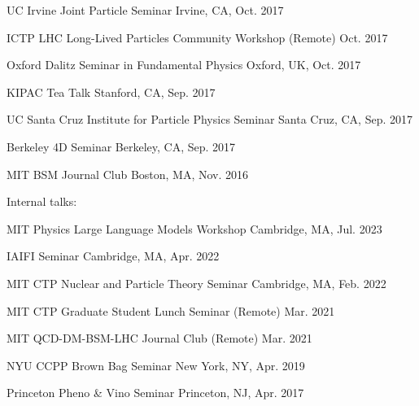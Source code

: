 \documentclass[letterpaper,11pt]{article}
\newenvironment{packed_itemize}{
\begin{itemize}[label=\raisebox{0.25ex}{\tiny$\bullet$}]
  \setlength{\itemsep}{4.0pt}
  \setlength{\parskip}{0pt}
  \setlength{\parsep}{0pt}}{\end{itemize}
}
\begin{document}
\begin{packed_itemize}
  \item UC Irvine Joint Particle Seminar \hfill Irvine, CA, Oct. 2017
  \item ICTP LHC Long-Lived Particles Community Workshop (Remote) \hfill Oct. 2017
  \item Oxford Dalitz Seminar in Fundamental Physics  \hfill Oxford, UK, Oct. 2017
  \item KIPAC Tea Talk  \hfill Stanford, CA, Sep. 2017
  \item UC Santa Cruz Institute for Particle Physics Seminar  \hfill Santa Cruz, CA, Sep. 2017
  \item Berkeley 4D Seminar  \hfill Berkeley, CA, Sep. 2017
  \item MIT BSM Journal Club \hfill Boston, MA, Nov. 2016
\end{packed_itemize}

\vspace{2mm}

\noindent
Internal talks:
\begin{packed_itemize}
  \item MIT Physics Large Language Models Workshop \hfill Cambridge, MA, Jul. 2023
  \item IAIFI Seminar \hfill Cambridge, MA, Apr. 2022
  \item MIT CTP Nuclear and Particle Theory Seminar \hfill Cambridge, MA, Feb. 2022
  \item MIT CTP Graduate Student Lunch Seminar (Remote) \hfill Mar. 2021
  \item MIT QCD-DM-BSM-LHC Journal Club (Remote) \hfill Mar. 2021
  \item NYU CCPP Brown Bag Seminar \hfill New York, NY, Apr. 2019
  \item Princeton Pheno \& Vino Seminar \hfill Princeton, NJ, Apr. 2017
\end{packed_itemize}

\vspace{2mm}
\end{document}
